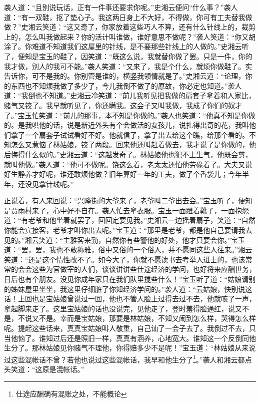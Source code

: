 \documentclass[12pt,oneside]{book}
\begin{document}
袭人道：“且别说玩话，正有一件事还要求你呢。”史湘云便问“什么事？”袭人道：“有一双鞋，抠了垫心子。我这两日身上不大好，不得做，你可有工夫替我做做？”史湘云笑道：“这又奇了，你家放着这些巧人不算，还有什么针线上的，裁剪上的，怎么叫我做起来？你的活计叫谁做，谁好意思不做呢？”袭人笑道：“你又胡涂了。你难道不知道我们这屋里的针线，是不要那些针线上的人做的。”史湘云听了，便知是宝玉的鞋了，因笑道：“既这么说，我就替你做了罢。只是一件，你的我才做，别人的我可不能。”袭人笑道：“又来了，我是个什么，就烦你做鞋了。实告诉你，可不是我的。你别管是谁的，横竖我领情就是了。”史湘云道：“论理，你的东西也不知烦我做了多少了，今儿我倒不做了的原故，你必定也知道。”袭人道：“我倒也不知道。”史湘云冷笑道：“前儿我听见把我做的扇套子拿着和人家比，赌气又铰了。我早就听见了，你还瞒我。这会子又叫我做，我成了你们的奴才了。”宝玉忙笑道：“前儿的那事，本不知是你做的。”袭人也笑道：“他真不知是你做的。是我哄他的话，说是新近外头有个会做活的女孩儿，说扎得出奇的花，我叫他们拿了一个扇套子试试看好不好。他就信了，拿了出去给这个瞧，给那个看的。不知怎么又惹恼了林姑娘，铰了两段。回来他还叫赶着做去，我才说了是你做的，他后悔得什么似的。”史湘云道：“这越发奇了。林姑娘他也犯不上生气，他既会剪，就叫他做。”袭人道：“他可不做呢。饶这么着，老太太还怕他劳碌着了。大夫又说好生静养才好呢，谁还敢烦他做？旧年算好一年的工夫，做了个香袋儿；今年半年，还没见拿针线呢。”

正说着，有人来回说：“兴隆街的大爷来了，老爷叫二爷出去会。”宝玉听了，便知是贾雨村来了，心中好不自在。袭人忙去拿衣服。宝玉一面蹬着靴子，一面抱怨道：“有老爷和他坐着就罢了，回回定要见我。”史湘云一边摇着扇子，笑道：“自然你能会宾接客，老爷才叫你出去呢。”宝玉道：“那里是老爷，都是他自己要请我去见的。”湘云笑道：“主雅客来勤，自然你有些警他的好处，他才只要会你。”宝玉道：“罢，罢，我也不敢称雅，俗中又俗的一个俗人，并不愿同这些人往来。”湘云笑道：“还是这个情性改不了。如今大了，你就不愿读书去考举人进士的，也该常常的会会这些为官做宰的人们，谈谈讲讲些仕途经济的学问，也好将来应酬世务，日后也有个朋友。没见你成年家只在我们队里搅些什么！”宝玉听了道：“姑娘请别的姊妹屋里坐坐，我这里仔细脏了你知经济学问的。”袭人道：“云姑娘，快别说这话！上回也是宝姑娘曾说过一回，他也不管人脸上过得去过不去，他就咳了一声，拿起脚来走了。这里宝姑娘的话也没说完，见他走了，登时羞得脸通红，说又不是，不说又不是。幸而是宝姑娘，那要是林姑娘，不知又闹到怎么样，哭得怎么样呢。提起这些话来，真真宝姑娘叫人敬重，自己讪了一会子去了。我倒过不去，只当他恼了。谁知过后还是照旧一样，真真有涵养，心地宽大。谁知这一个反倒同他生分了。那林姑娘见你赌气不理他，你得赔多少不是呢！”宝玉道：“林姑娘从来说过这些混帐话不曾？若他也说过这些混帐话，我早和他生分了\footnote{仕途应酬确有混账之处，不能概论}。”袭人和湘云都点头笑道：“这原是混帐话。”
\end{document}
